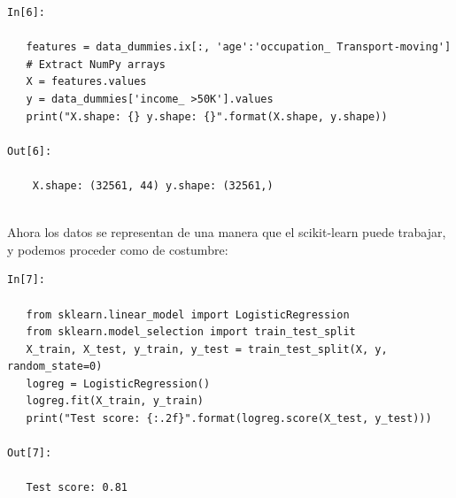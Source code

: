 \begin{lstlisting}
In[6]:

   features = data_dummies.ix[:, 'age':'occupation_ Transport-moving']
   # Extract NumPy arrays
   X = features.values
   y = data_dummies['income_ >50K'].values
   print("X.shape: {} y.shape: {}".format(X.shape, y.shape))

Out[6]:

    X.shape: (32561, 44) y.shape: (32561,)
    
\end{lstlisting}

Ahora los datos se representan de una manera que el {\ttfamily scikit-learn} puede trabajar,  y podemos proceder como de costumbre:

\begin{lstlisting}
In[7]:

   from sklearn.linear_model import LogisticRegression
   from sklearn.model_selection import train_test_split
   X_train, X_test, y_train, y_test = train_test_split(X, y, random_state=0)
   logreg = LogisticRegression()
   logreg.fit(X_train, y_train)
   print("Test score: {:.2f}".format(logreg.score(X_test, y_test)))

Out[7]:
   
   Test score: 0.81
\end{lstlisting}



\newpage



